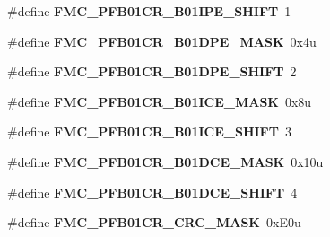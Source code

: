 \begin{DoxyCompactItemize}
\item 
\hypertarget{group___f_m_c___register___masks_gadebea8214df64474b227afacf87bcf64}{}\#define {\bfseries F\+M\+C\+\_\+\+P\+F\+B01\+C\+R\+\_\+\+B01\+I\+P\+E\+\_\+\+S\+H\+I\+F\+T}~1\label{group___f_m_c___register___masks_gadebea8214df64474b227afacf87bcf64}

\item 
\hypertarget{group___f_m_c___register___masks_gad758c1cbb6d84e726db815c98e417653}{}\#define {\bfseries F\+M\+C\+\_\+\+P\+F\+B01\+C\+R\+\_\+\+B01\+D\+P\+E\+\_\+\+M\+A\+S\+K}~0x4u\label{group___f_m_c___register___masks_gad758c1cbb6d84e726db815c98e417653}

\item 
\hypertarget{group___f_m_c___register___masks_ga6fd0b3f4de8f7d0f75b2ce6e9d8cb811}{}\#define {\bfseries F\+M\+C\+\_\+\+P\+F\+B01\+C\+R\+\_\+\+B01\+D\+P\+E\+\_\+\+S\+H\+I\+F\+T}~2\label{group___f_m_c___register___masks_ga6fd0b3f4de8f7d0f75b2ce6e9d8cb811}

\item 
\hypertarget{group___f_m_c___register___masks_ga8ce14349dee5c0398a249e4a759cbb93}{}\#define {\bfseries F\+M\+C\+\_\+\+P\+F\+B01\+C\+R\+\_\+\+B01\+I\+C\+E\+\_\+\+M\+A\+S\+K}~0x8u\label{group___f_m_c___register___masks_ga8ce14349dee5c0398a249e4a759cbb93}

\item 
\hypertarget{group___f_m_c___register___masks_ga22137237a7cffde5cfd22ed4ed9fb203}{}\#define {\bfseries F\+M\+C\+\_\+\+P\+F\+B01\+C\+R\+\_\+\+B01\+I\+C\+E\+\_\+\+S\+H\+I\+F\+T}~3\label{group___f_m_c___register___masks_ga22137237a7cffde5cfd22ed4ed9fb203}

\item 
\hypertarget{group___f_m_c___register___masks_ga42bff02ef28c09ef031281e0db2abe11}{}\#define {\bfseries F\+M\+C\+\_\+\+P\+F\+B01\+C\+R\+\_\+\+B01\+D\+C\+E\+\_\+\+M\+A\+S\+K}~0x10u\label{group___f_m_c___register___masks_ga42bff02ef28c09ef031281e0db2abe11}

\item 
\hypertarget{group___f_m_c___register___masks_ga1ef4b82a30ca72370c5492461d54ceaa}{}\#define {\bfseries F\+M\+C\+\_\+\+P\+F\+B01\+C\+R\+\_\+\+B01\+D\+C\+E\+\_\+\+S\+H\+I\+F\+T}~4\label{group___f_m_c___register___masks_ga1ef4b82a30ca72370c5492461d54ceaa}

\item 
\hypertarget{group___f_m_c___register___masks_ga398cb6cdf764124c8ad984fac8ef340a}{}\#define {\bfseries F\+M\+C\+\_\+\+P\+F\+B01\+C\+R\+\_\+\+C\+R\+C\+\_\+\+M\+A\+S\+K}~0x\+E0u\label{group___f_m_c___register___masks_ga398cb6cdf764124c8ad984fac8ef340a}


\end{DoxyCompactItemize}
